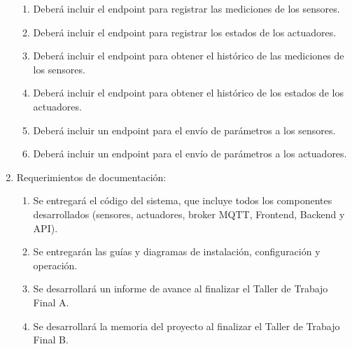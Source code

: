 \begin{enumerate}
\begin{enumerate}
		      \item Deberá incluir el endpoint para registrar las mediciones de los sensores.
		      \item Deberá incluir el endpoint para registrar los estados de los actuadores.
		      \item Deberá incluir el endpoint para obtener el histórico de las mediciones de los sensores.
		      \item Deberá incluir el endpoint para obtener el histórico de los estados de los actuadores.
		      \item Deberá incluir un endpoint para el envío de parámetros a los sensores.
		      \item Deberá incluir un endpoint para el envío de parámetros a los actuadores.
	      \end{enumerate}

	\item Requerimientos de documentación:
	      \begin{enumerate}
		      \item Se entregará el código del sistema, que incluye todos los componentes desarrollados (sensores, actuadores, broker MQTT, Frontend, Backend y API).
		      \item Se entregarán las guías y diagramas de instalación, configuración y operación.
		      \item Se desarrollará un informe de avance al finalizar el Taller de Trabajo Final A.
		      \item Se desarrollará la memoria del proyecto al finalizar el Taller de Trabajo Final B.
	      \end{enumerate}
\end{enumerate}

